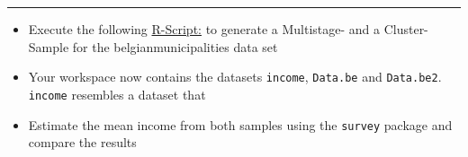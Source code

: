 \documentclass[]{article}
\begin{document}
\begin{center}\rule{0.5\linewidth}{\linethickness}\end{center}

\begin{itemize}
\itemsep1pt\parskip0pt
\item
  Execute the following
  \href{https://raw.githubusercontent.com/BernStZi/SamplingAndEstimation/short/tutorial/Samples_for_EX3b.R}{R-Script:}
  to generate a Multistage- and a Cluster- Sample for the
  belgianmunicipalities data set
\item
  Your workspace now contains the datasets \texttt{income},
  \texttt{Data.be} and \texttt{Data.be2}. \texttt{income} resembles a
  dataset that
\item
  Estimate the mean income from both samples using the \texttt{survey}
  package and compare the results
\end{itemize}
\end{document}
